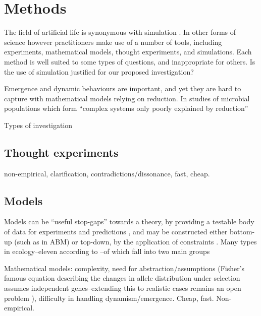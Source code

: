 \section{Methods}

The field of artificial life is synonymous with simulation \autocite[chap.2]{Aicardi2010}. In other forms of science however practitioners make use of a number of tools, including experiments, mathematical models, thought experiments, and simulations. Each method is well suited to some types of questions, and inappropriate for others. Is the use of simulation justified for our proposed investigation?

Emergence and dynamic behaviours are important, and yet they are hard to capture with mathematical models relying on reduction. In studies of microbial populations which form ``complex systems only poorly explained by reduction'' \autocite{Ferrer:2008hv}

Types of investigation

\subsection{Thought experiments}\label{thought-experiments}

non-empirical, clarification, contradictions/dissonance, fast, cheap.

\subsection{Models}\label{models}


Models can be ``useful stop-gaps'' towards a theory, by providing a testable body of data for experiments and predictions \autocite{Krakauer2011}, and may be constructed either bottom-up (such as in ABM) or top-down, by the application of constraints \autocite{Krakauer2011}. Many types in \eg ecology--eleven according to \autocite{Jorgensen2008}--of which fall into two main groups

Mathematical models: complexity, need for abstraction/assumptions
(\eg Fisher's famous equation describing the changes in allele
distribution under selection assumes independent genes--extending this
to realistic cases remains an open problem \autocite{Schuster2011}),
difficulty in handling dynamism/emergence. Cheap, fast. Non-empirical.

